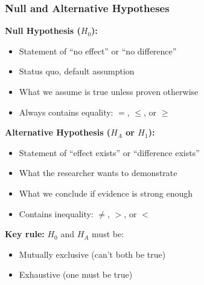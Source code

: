 \documentclass{beamer}
\begin{document}
\begin{frame}
\frametitle{Null and Alternative Hypotheses}
\textbf{Null Hypothesis ($H_0$):}
\begin{itemize}
\item Statement of ``no effect'' or ``no difference''
\item Status quo, default assumption
\item What we assume is true unless proven otherwise
\item Always contains equality: $=$, $\leq$, or $\geq$
\end{itemize}

\vspace{0.5cm}
\textbf{Alternative Hypothesis ($H_A$ or $H_1$):}
\begin{itemize}
\item Statement of ``effect exists'' or ``difference exists''
\item What the researcher wants to demonstrate
\item What we conclude if evidence is strong enough
\item Contains inequality: $\neq$, $>$, or $<$
\end{itemize}

\vspace{0.5cm}
\textbf{Key rule:} $H_0$ and $H_A$ must be:
\begin{itemize}
\item Mutually exclusive (can't both be true)
\item Exhaustive (one must be true)
\end{itemize}
\end{frame}
\end{document}
